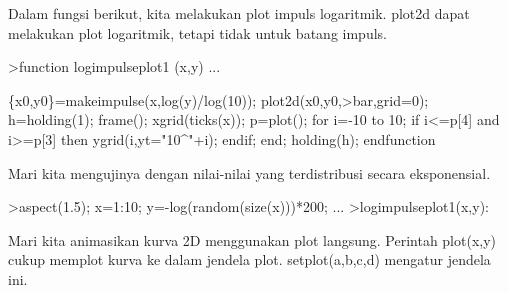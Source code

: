 \documentclass[a4paper,10pt]{article}
\begin{document}
\begin{eulernotebook}
\begin{eulercomment}
\begin{eulercomment}
\begin{eulercomment}
\begin{eulercomment}
\begin{eulercomment}
\begin{eulercomment}
\begin{eulercomment}
\begin{eulercomment}
\begin{eulercomment}
\begin{eulercomment}
\begin{eulercomment}
\begin{eulercomment}
\begin{eulercomment}
Dalam fungsi berikut, kita melakukan plot impuls logaritmik. plot2d
dapat melakukan plot logaritmik, tetapi tidak untuk batang impuls.
\end{eulercomment}
\begin{eulerprompt}
>function logimpulseplot1 (x,y) ...
\end{eulerprompt}
\begin{eulerudf}
  \{x0,y0\}=makeimpulse(x,log(y)/log(10));
    plot2d(x0,y0,>bar,grid=0);
    h=holding(1);
    frame();
    xgrid(ticks(x));
    p=plot();
    for i=-10 to 10;
      if i<=p[4] and i>=p[3] then
         ygrid(i,yt="10^"+i);
      endif;
    end;
    holding(h);
  endfunction
\end{eulerudf}
\begin{eulercomment}
Mari kita mengujinya dengan nilai-nilai yang terdistribusi secara
eksponensial.
\end{eulercomment}
\begin{eulerprompt}
>aspect(1.5); x=1:10; y=-log(random(size(x)))*200; ...
>logimpulseplot1(x,y):
\end{eulerprompt}
\begin{eulercomment}
Mari kita animasikan kurva 2D menggunakan plot langsung. Perintah
plot(x,y) cukup memplot kurva ke dalam jendela plot. setplot(a,b,c,d)
mengatur jendela ini.


\end{eulercomment}
\end{eulercomment}
\end{eulercomment}
\end{eulercomment}
\end{eulercomment}
\end{eulercomment}
\end{eulercomment}
\end{eulercomment}
\end{eulercomment}
\end{eulercomment}
\end{eulercomment}
\end{eulercomment}
\end{eulercomment}
\end{eulernotebook}
\end{document}
